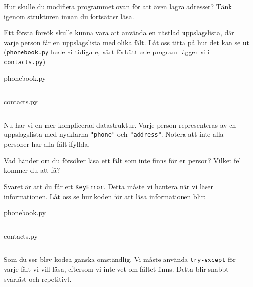 \begin{exercise}
  Hur skulle du modifiera programmet ovan för att även lagra adresser?
  Tänk igenom strukturen innan du fortsätter läsa.
\end{exercise}


Ett första försök skulle kunna vara att använda en nästlad uppslagslista, 
där varje person får en uppslagslista med olika fält. Låt oss titta på hur det 
kan se ut (\texttt{phonebook.py} hade vi tidigare, vårt förbättrade program 
lägger vi i \texttt{contacts.py}):

\begin{frame}[fragile]
  phonebook.py \hrulefill
  \inputminted[linenos,firstline=5,lastline=6]{python}{examples/phonebook.py}
  \vspace{0.5em}
  contacts.py \hrulefill
  \inputminted[linenos,firstline=5,lastline=16]{python}{examples/contacts.py}
\end{frame}

Nu har vi en mer komplicerad datastruktur. Varje person representeras av 
en uppslagslista med nycklarna \texttt{"phone"} och \texttt{"address"}. 
Notera att inte alla personer har alla fält ifyllda.

\begin{exercise}
  Vad händer om du försöker läsa ett fält som inte finns för en person? 
  Vilket fel kommer du att få?
\end{exercise}

Svaret är att du får ett \texttt{KeyError}. Detta måste vi hantera när vi 
läser informationen. Låt oss se hur koden för att läsa informationen blir:

\begin{frame}[fragile]
  phonebook.py \hrulefill
  \inputminted[linenos,firstline=13,lastline=13]{python}{examples/phonebook.py}
  \vspace{0.5em}
  contacts.py \hrulefill
  \inputminted[linenos,firstline=25,lastline=35]{python}{examples/contacts.py}
\end{frame}

Som du ser blev koden ganska omständlig. Vi måste använda \texttt{try-except} 
för varje fält vi vill läsa, eftersom vi inte vet om fältet finns. Detta blir 
snabbt svårläst och repetitivt.

